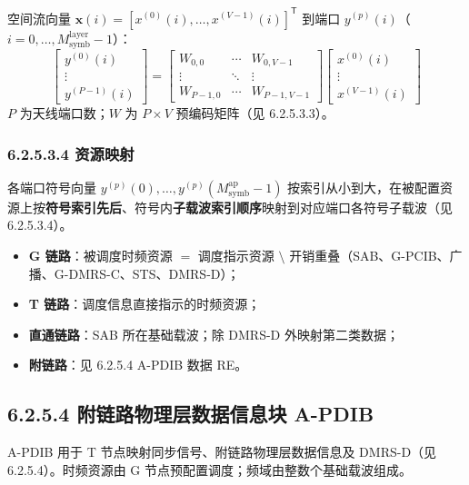 \documentclass[11pt,a4paper]{ctexart}
\begin{document}
空间流向量 $\mathbf{x}(i)=[x^{(0)}(i),\ldots,x^{(V-1)}(i)]^{\mathsf T}$ 到端口 $y^{(p)}(i)$（$i=0,\ldots,M_{\mathrm{symb}}^{\mathrm{layer}}-1$）：
\begin{equation}
\begin{bmatrix}
y^{(0)}(i) \\ \vdots \\ y^{(P-1)}(i)
\end{bmatrix}
=
\begin{bmatrix}
W_{0,0} & \cdots & W_{0,V-1} \\
\vdots & \ddots & \vdots \\
W_{P-1,0} & \cdots & W_{P-1,V-1}
\end{bmatrix}
\begin{bmatrix}
x^{(0)}(i) \\ \vdots \\ x^{(V-1)}(i)
\end{bmatrix}
\end{equation}
$P$ 为天线端口数；$W$ 为 $P \times V$ 预编码矩阵（见 6.2.5.3.3）。

\subsubsection{6.2.5.3.4 资源映射}

各端口符号向量 $y^{(p)}(0),\ldots,y^{(p)}(M_{\mathrm{symb}}^{\mathrm{ap}}-1)$ 按索引从小到大，在被配置资源上按\textbf{符号索引先后}、符号内\textbf{子载波索引顺序}映射到对应端口各符号子载波（见 6.2.5.3.4）。

\begin{itemize}[nosep]
  \item \textbf{G 链路}：被调度时频资源 $=$ 调度指示资源 $\setminus$ 开销重叠（SAB、G-PCIB、广播、G-DMRS-C、STS、DMRS-D）；
  \item \textbf{T 链路}：调度信息直接指示的时频资源；
  \item \textbf{直通链路}：SAB 所在基础载波；除 DMRS-D 外映射第二类数据；
  \item \textbf{附链路}：见 6.2.5.4 A-PDIB 数据 RE。
\end{itemize}

\subsection{6.2.5.4 附链路物理层数据信息块 A-PDIB}

A-PDIB 用于 T 节点映射同步信号、附链路物理层数据信息及 DMRS-D（见 6.2.5.4）。时频资源由 G 节点预配置调度；频域由整数个基础载波组成。
\end{document}
